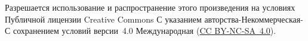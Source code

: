

\vspace*{\fill}
\noindent Разрешается использование и распространение этого
произведения на условиях Публичной лицензии Creative Commons
С указанием авторства-Неком\-мерческая-С сохранением условий
версии~4.0 Международная
(\href{https://creativecommons.org/licenses/by-nc-sa/4.0/legalcode.ru}%
{CC BY-NC-SA~4.0}).

\tableofcontents

